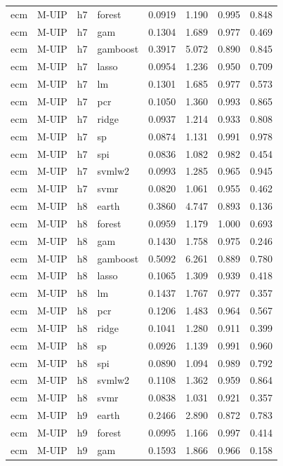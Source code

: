 \begin{ThreePartTable}
\begin{longtable}[t]{llclcccc}
ecm & M-UIP & h7 & forest & 0.0919 & 1.190 & 0.995 & 0.848\\
ecm & M-UIP & h7 & gam & 0.1304 & 1.689 & 0.977 & 0.469\\
ecm & M-UIP & h7 & gamboost & 0.3917 & 5.072 & 0.890 & 0.845\\
ecm & M-UIP & h7 & lasso & 0.0954 & 1.236 & 0.950 & 0.709\\
ecm & M-UIP & h7 & lm & 0.1301 & 1.685 & 0.977 & 0.573\\
ecm & M-UIP & h7 & pcr & 0.1050 & 1.360 & 0.993 & 0.865\\
ecm & M-UIP & h7 & ridge & 0.0937 & 1.214 & 0.933 & 0.808\\
ecm & M-UIP & h7 & sp & 0.0874 & 1.131 & 0.991 & 0.978\\
ecm & M-UIP & h7 & spi & 0.0836 & 1.082 & 0.982 & 0.454\\
ecm & M-UIP & h7 & svmlw2 & 0.0993 & 1.285 & 0.965 & 0.945\\
ecm & M-UIP & h7 & svmr & 0.0820 & 1.061 & 0.955 & 0.462\\
\addlinespace
ecm & M-UIP & h8 & earth & 0.3860 & 4.747 & 0.893 & 0.136\\
ecm & M-UIP & h8 & forest & 0.0959 & 1.179 & 1.000 & 0.693\\
ecm & M-UIP & h8 & gam & 0.1430 & 1.758 & 0.975 & 0.246\\
ecm & M-UIP & h8 & gamboost & 0.5092 & 6.261 & 0.889 & 0.780\\
ecm & M-UIP & h8 & lasso & 0.1065 & 1.309 & 0.939 & 0.418\\
ecm & M-UIP & h8 & lm & 0.1437 & 1.767 & 0.977 & 0.357\\
ecm & M-UIP & h8 & pcr & 0.1206 & 1.483 & 0.964 & 0.567\\
ecm & M-UIP & h8 & ridge & 0.1041 & 1.280 & 0.911 & 0.399\\
ecm & M-UIP & h8 & sp & 0.0926 & 1.139 & 0.991 & 0.960\\
ecm & M-UIP & h8 & spi & 0.0890 & 1.094 & 0.989 & 0.792\\
ecm & M-UIP & h8 & svmlw2 & 0.1108 & 1.362 & 0.959 & 0.864\\
ecm & M-UIP & h8 & svmr & 0.0838 & 1.031 & 0.921 & 0.357\\
\addlinespace
ecm & M-UIP & h9 & earth & 0.2466 & 2.890 & 0.872 & 0.783\\
ecm & M-UIP & h9 & forest & 0.0995 & 1.166 & 0.997 & 0.414\\
ecm & M-UIP & h9 & gam & 0.1593 & 1.866 & 0.966 & 0.158\\

\end{longtable}
\end{ThreePartTable}
